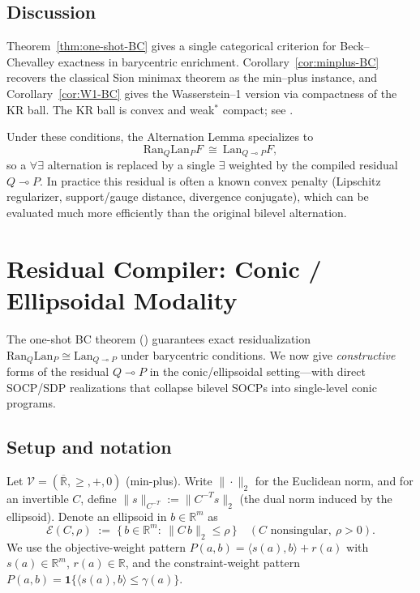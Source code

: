 \documentclass[11pt]{article}
\numberwithin{equation}{section}
\theoremstyle{upright}
\newcommand{\V}{\mathcal{V}}
\newcommand{\Lan}{\mathrm{Lan}}
\newcommand{\Ran}{\mathrm{Ran}}
\newcommand{\resid}{\multimap}
\begin{document}
\subsection{Discussion}

Theorem~\ref{thm:one-shot-BC} gives a single categorical
criterion for Beck--Chevalley exactness in barycentric enrichment.
Corollary~\ref{cor:minplus-BC} recovers the classical Sion minimax theorem
as the min--plus instance, and Corollary~\ref{cor:W1-BC} gives the
Wasserstein--1 version via compactness of the KR ball. The KR ball is convex and 
weak$^\ast$ compact; see \cite{Villani2009}.

Under these conditions, the Alternation Lemma specializes to
\[
\Ran_Q\Lan_PF\ \cong\ \Lan_{Q\resid P}F,
\]
so a $\forall\exists$ alternation is replaced by a single $\exists$
weighted by the compiled residual $Q\resid P$.
In practice this residual is often a known convex penalty
(Lipschitz regularizer, support/gauge distance, divergence conjugate),
which can be evaluated much more efficiently than the original bilevel alternation.

\section{Residual Compiler: Conic / Ellipsoidal Modality}\label{sec:residual-compiler-conic}

The one-shot BC theorem () guarantees exact residualization
$\Ran_Q\Lan_P\cong \Lan_{Q\resid P}$ under barycentric conditions. We now give
\emph{constructive} forms of the residual $Q\resid P$ in the conic/ellipsoidal setting—with 
direct SOCP/SDP realizations that collapse bilevel SOCPs into single-level conic programs.

\subsection{Setup and notation}
Let $\V=(\overline{\mathbb R},\ge,+,0)$ (min-plus). Write $\|\cdot\|_2$ for the Euclidean norm,
and for an invertible $C$, define $\|s\|_{C^{-T}}:=\|C^{-T}s\|_2$ (the dual norm induced by the ellipsoid).
Denote an ellipsoid in $b\in\mathbb R^m$ as
\[
\mathcal E(C,\rho)\;:=\;\{\,b\in\mathbb R^m:\ \|C\,b\|_2\le\rho\,\}\quad(C\text{ nonsingular},\ \rho>0).
\]
We use the objective-weight pattern $P(a,b)=\langle s(a), b\rangle + r(a)$ with $s(a)\in\mathbb R^m$, $r(a)\in\mathbb R$,
and the constraint-weight pattern $P(a,b)=\mathbf 1\{\langle s(a),b\rangle\le \gamma(a)\}$.
\end{document}
